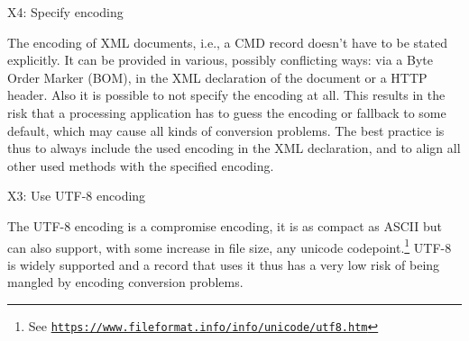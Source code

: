 \begin{workinprogress}
X4: Specify encoding


The encoding of XML documents, i.e., a CMD record doesn't have to be stated explicitly. It can be provided in various, possibly conflicting ways: via a Byte Order Marker (BOM), in the XML declaration of the document or a HTTP header. Also it is possible to not specify the encoding at all. This results in the risk that a processing application has to guess the encoding or fallback to some default, which may cause all kinds of conversion problems. The best practice is thus to always include the used encoding in the XML declaration, and to align all other used methods with the specified encoding.

X3: Use UTF-8 encoding


The UTF-8 encoding is a compromise encoding, it is as compact as ASCII but can also support, with some increase in file size, any unicode codepoint.\footnote{See \href{https://www.fileformat.info/info/unicode/utf8.htm}{\nolinkurl{https://www.fileformat.info/info/unicode/utf8.htm}}} UTF-8 is widely supported and a record that uses it thus has a very low risk of being mangled by encoding conversion problems.
\end{workinprogress}